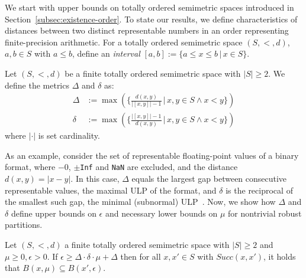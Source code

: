 We start with upper bounds on totally ordered semimetric spaces introduced in Section~\ref{subsec:existence-order}. To state our results, we define characteristics of distances between two distinct representable numbers in an order representing finite-precision arithmetic. For a totally ordered semimetric space $(S,<,d)$, $a, b \in S$ with $a \leq b$, define an \textit{interval} $[a, b] := \{a \leq x \leq b\,|\,x \in S\}$.
\begin{definition}
\label{def:precision_gap}
    Let $(S, <, d)$ be a finite totally ordered semimetric space with $|S| \geq 2$. We define the metrics $\Delta$ and $\delta$ as:
    \begin{align*}
        \Delta &:= \max(\{\frac{d(x,y)}{|[x,y]| -1}\,|\,x, y \in S \wedge x < y\}) \\
        \delta &:= \max(\{\frac{|[x,y]| - 1}{d(x,y)}\,|\,x, y \in S \wedge x < y\})
    \end{align*}
    where $|\cdot|$ is set cardinality.
\end{definition}
As an example, consider the set of representable floating-point values of a binary format, where $-0$, $\pm$\texttt{Inf} and \texttt{NaN} are excluded, and the distance $d(x,y) = |x-y|$. In this case, $\Delta$ equals the largest gap between consecutive representable values, the maximal ULP of the format, and $\delta$ is the reciprocal of the smallest such gap, the minimal (subnormal) ULP~\cite{deDinechin2024}. Now, we show how $\Delta$ and $\delta$ define upper bounds on $\epsilon$ and necessary lower bounds on $\mu$ for nontrivial robust partitions.
\begin{theorem}
\label{thm:bounds-total}
    Let $(S, <, d)$ a finite totally ordered semimetric space with $|S| \geq 2$ and $\mu \geq 0, \epsilon > 0$. If $\epsilon \geq \Delta \cdot \delta \cdot \mu + \Delta$ then for all $x, x' \in S$ with $Succ(x,x')$, it holds that $B(x, \mu) \subseteq B(x', \epsilon)$. 
\end{theorem}
